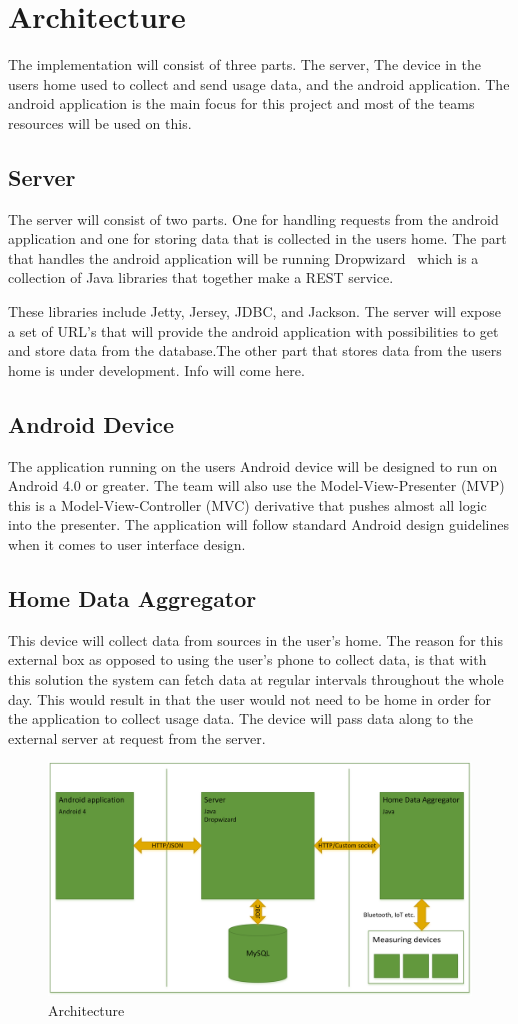\newpage
\section{Architecture}
The implementation will consist of three parts. The server, The device in the users home used to 
collect and send usage data, and the android application. The android application is the main focus for 
this project and most of the teams resources will be used on this.

\subsection{Server}
The server will consist of two parts. One for handling requests from the android application and one for storing data that is collected in the users home. 
The part that handles the android application will be running Dropwizard~\cite{dropwizard} which is a collection of Java libraries that together make a REST service. 

These libraries include Jetty, Jersey, JDBC, and Jackson. The server will expose a set of URL’s that will provide the android application with 
possibilities to get and store data from the database.The other part that stores data from the users home is under development. Info will come here.

\subsection{Android Device}
The application running on the users Android device will be designed to run on Android 4.0 or greater.
The team will also use the Model-View-Presenter (MVP)~\cite{mvp} this is a Model-View-Controller (MVC)\cite{mvc} derivative 
that pushes almost all logic into the presenter. The application will follow standard Android design guidelines 
when it comes to user interface design.

\subsection{Home Data Aggregator}
This device will collect data from sources in the user's home. The reason for this external box as opposed to using 
the user's phone to collect data, is that with this solution the system can fetch data at regular intervals throughout 
the whole day. This would result in that the user would not need to be home in order for the application to collect 
usage data. The device will pass data along to the external server at request from the server.

\begin{figure}[H]
\includegraphics[width=\textwidth]{ch/planning/fig/architecture.png}
\caption{Architecture}
\end{figure}
